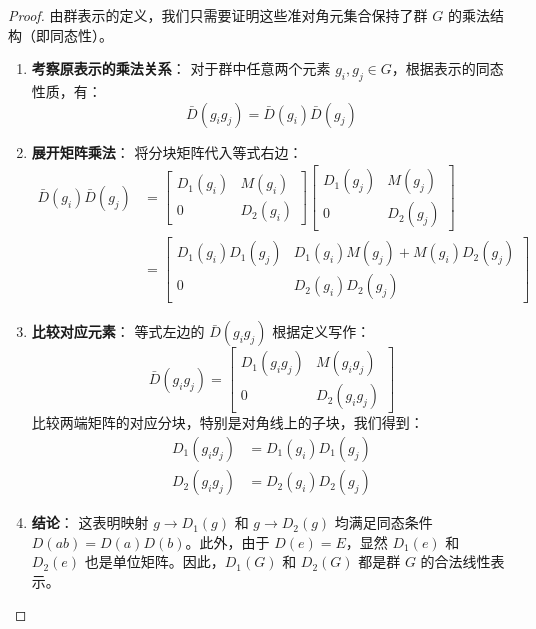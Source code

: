 \begin{proof}
    由群表示的定义，我们只需要证明这些准对角元集合保持了群 $G$ 的乘法结构（即同态性）。
    
    \begin{enumerate}
        \item \textbf{考察原表示的乘法关系}：
    对于群中任意两个元素 $g_i, g_j \in G$，根据表示的同态性质，有：
    \begin{equation}
        \bar{D}(g_i g_j) = \bar{D}(g_i) \bar{D}(g_j)
    \end{equation}
    
        \item \textbf{展开矩阵乘法}：
    将分块矩阵代入等式右边：
    \begin{equation}
        \begin{aligned}
            \bar{D}(g_i) \bar{D}(g_j) &= \begin{bmatrix} D_1(g_i) & M(g_i) \\ 0 & D_2(g_i) \end{bmatrix} \begin{bmatrix} D_1(g_j) & M(g_j) \\ 0 & D_2(g_j) \end{bmatrix} \\
            &= \begin{bmatrix} D_1(g_i)D_1(g_j) & D_1(g_i)M(g_j) + M(g_i)D_2(g_j) \\ 0 & D_2(g_i)D_2(g_j) \end{bmatrix}
        \end{aligned}
    \end{equation}
    
        \item \textbf{比较对应元素}：
    等式左边的 $\bar{D}(g_i g_j)$ 根据定义写作：
    \begin{equation}
        \bar{D}(g_i g_j) = \begin{bmatrix} D_1(g_i g_j) & M(g_i g_j) \\ 0 & D_2(g_i g_j) \end{bmatrix}
    \end{equation}
    比较两端矩阵的对应分块，特别是对角线上的子块，我们得到：
    \begin{equation}
        \begin{aligned}
            D_1(g_i g_j) &= D_1(g_i) D_1(g_j) \\
            D_2(g_i g_j) &= D_2(g_i) D_2(g_j)
        \end{aligned}
    \end{equation}
    
        \item \textbf{结论}：
        这表明映射 $g \to D_1(g)$ 和 $g \to D_2(g)$ 均满足同态条件 $D(ab) = D(a)D(b)$。此外，由于 $D(e) = E$，显然 $D_1(e)$ 和 $D_2(e)$ 也是单位矩阵。因此，$D_1(G)$ 和 $D_2(G)$ 都是群 $G$ 的合法线性表示。
    \end{enumerate}
\end{proof}

